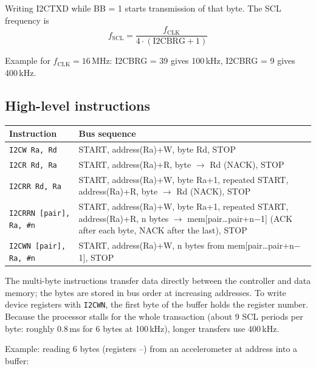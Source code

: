 Writing I2CTXD while BB = 1 starts transmission of that byte. The SCL
frequency is
\begin{equation}
  f_{\mathrm{SCL}} = \frac{f_{\mathrm{CLK}}}{4 \cdot (\mathrm{I2CBRG} + 1)}
  \label{eq:scl}
\end{equation}

Example for $f_{\mathrm{CLK}} = 16$\,MHz: I2CBRG = 39 gives 100\,kHz,
I2CBRG = 9 gives 400\,kHz.

\subsection{High-level instructions}
\label{sec:i2c-hl}

\begin{center}
\small
\begin{tabularx}{\linewidth}{@{}l X@{}}
  \toprule
  \textbf{Instruction} & \textbf{Bus sequence} \\
  \midrule
  \texttt{I2CW Ra, Rd}  & START, address(Ra)+W, byte Rd, STOP \\
  \texttt{I2CR Rd, Ra}  & START, address(Ra)+R, byte $\rightarrow$ Rd (NACK), STOP \\
  \texttt{I2CRR Rd, Ra} & START, address(Ra)+W, byte Ra+1, repeated START,
                          address(Ra)+R, byte $\rightarrow$ Rd (NACK), STOP \\
  \texttt{I2CRRN [pair], Ra, \#n} & START, address(Ra)+W, byte Ra+1, repeated START,
                          address(Ra)+R, n bytes $\rightarrow$ mem[pair\ldots pair+n$-$1]
                          (ACK after each byte, NACK after the last), STOP \\
  \texttt{I2CWN [pair], Ra, \#n} & START, address(Ra)+W, n bytes from
                          mem[pair\ldots pair+n$-$1], STOP \\
  \bottomrule
\end{tabularx}
\end{center}

The multi-byte instructions transfer data directly between the \IIC{}
controller and data memory; the bytes are stored in bus order at increasing
addresses. To write device registers with \texttt{I2CWN}, the first byte of
the buffer holds the register number. Because the processor stalls for the
whole transaction (about 9 SCL periods per byte: roughly 0.8\,ms for 6 bytes
at 100\,kHz), longer transfers \SHOULD{} use 400\,kHz.

Example: reading 6 bytes (registers --) from an
accelerometer at address  into a buffer:

